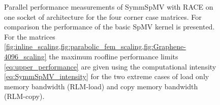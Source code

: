 \begin{figure}[tbhp]
	\centering
	\caption{Parallel performance measurements of \acrshort{SymmSpMV} with \acrshort{RACE} on one socket of \SKX architecture for the four corner case matrices. For comparison the performance of the basic \acrshort{SpMV} kernel is presented. For the matrices \cref{fig:inline_scaling,fig:parabolic_fem_scaling,fig:Graphene-4096_scaling} the maximum roofline performance limits \cref{eq:upper_performance} are given using the computational intensity \cref{eq:SymmSpMV_intensity} for the two extreme cases of load only memory bandwidth (RLM-load) and copy memory bandwidth (RLM-copy).}
	\label{fig:corner_cases_scaling}
\end{figure}

